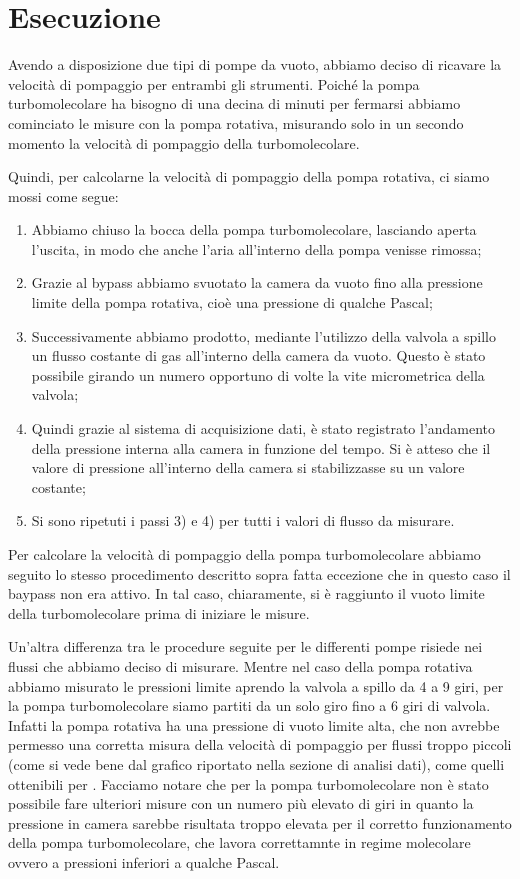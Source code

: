 \section{Esecuzione}

Avendo a disposizione due tipi di pompe da vuoto, abbiamo deciso di ricavare la velocità di pompaggio per entrambi gli strumenti.
Poiché la pompa turbomolecolare ha bisogno di una decina di minuti per fermarsi abbiamo cominciato le misure con la pompa rotativa,
misurando solo in un secondo momento la velocità di pompaggio della turbomolecolare.

Quindi, per calcolarne la velocità di pompaggio della pompa rotativa, ci siamo mossi come segue:

\begin{enumerate}
	\item{Abbiamo chiuso la bocca della pompa turbomolecolare, lasciando aperta l'uscita,
        in modo che anche l'aria all'interno della pompa venisse rimossa;}
	\item{Grazie al bypass abbiamo svuotato la camera da vuoto fino alla pressione limite della pompa rotativa, cioè una pressione di qualche Pascal;}
	\item{Successivamente abbiamo prodotto, mediante l'utilizzo della valvola a spillo un flusso costante di gas all'interno della camera da vuoto. Questo è stato possibile girando un numero opportuno di volte la vite micrometrica della valvola;}
	\item{Quindi grazie al sistema di acquisizione dati, è stato registrato l'andamento della pressione interna alla camera in funzione del tempo.  Si è atteso che il valore di pressione all'interno della camera si stabilizzasse su un valore costante;}
	\item{Si sono ripetuti i passi 3) e 4) per tutti i valori di flusso da misurare.}
\end{enumerate}

Per calcolare la velocità di pompaggio della pompa turbomolecolare abbiamo seguito lo stesso procedimento
descritto sopra fatta eccezione che in questo caso il baypass non era attivo. In tal caso, chiaramente,
si è raggiunto il vuoto limite della turbomolecolare prima di iniziare le misure.

Un'altra differenza tra le procedure seguite per le differenti pompe risiede nei flussi che abbiamo deciso di misurare.
Mentre nel caso della pompa rotativa abbiamo misurato le pressioni limite aprendo la valvola a spillo da 4 a 9 giri,
per la pompa turbomolecolare siamo partiti da un solo giro fino a 6 giri di valvola.
Infatti la pompa rotativa ha una pressione di vuoto limite alta, che non avrebbe permesso
una corretta misura della velocità di pompaggio per flussi troppo piccoli (come si vede bene dal grafico
riportato nella sezione di analisi dati), come quelli ottenibili per .
Facciamo notare che per la pompa turbomolecolare non è stato possibile fare ulteriori misure
con un numero più elevato di giri in quanto la pressione in camera sarebbe risultata troppo elevata per il corretto
funzionamento della pompa turbomolecolare, che lavora correttamnte in regime molecolare ovvero a pressioni inferiori a qualche Pascal.

